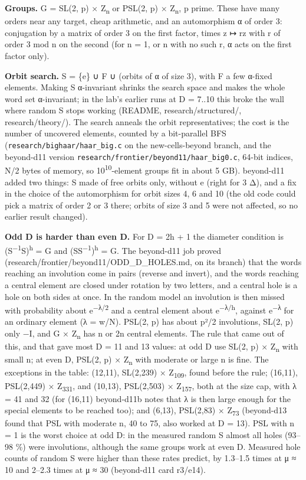 \documentclass[
  10pt,
]{article}
\begin{document}
\textbf{Groups.} G = SL(2, p) × Z\textsubscript{n} or PSL(2, p) × Z\textsubscript{n}, p prime. These have many orders
near any target, cheap arithmetic, and an automorphism α of order 3: conjugation by a matrix of order 3 on the first
factor, times z ↦ rz with r of order 3 mod n on the second (for n = 1, or n with no such r, α acts on the first factor
only).

\textbf{Orbit search.} S = \{e\} ∪ F ∪ (orbits of α of size 3), with F a few α-fixed elements. Making S α-invariant
shrinks the search space and makes the whole word set α-invariant; in the lab's earlier runs at D = 7..10 this broke
the wall where random S stops working (README, research/structured/, research/theory/). The search anneals the orbit
representatives; the cost is the number of uncovered elements, counted by a bit-parallel BFS
(\texttt{research/\allowbreak{}bighaar/\allowbreak{}haar\_\allowbreak{}big.c} on the new-cells-beyond branch, and the beyond-d11 version
\texttt{research/\allowbreak{}frontier/\allowbreak{}beyond11/\allowbreak{}haar\_\allowbreak{}big0.c}, 64-bit indices, N/2 bytes of memory, so
10\textsuperscript{10}-element groups fit in about 5 GB). beyond-d11 added two things: S made of free orbits only,
without e (right for 3 \textbar{} Δ), and a fix in the choice of the automorphism for orbit sizes 4, 6 and 10 (the old
code could pick a matrix of order 2 or 3 there; orbits of size 3 and 5 were not affected, so no earlier result
changed).

\textbf{Odd D is harder than even D.} For D = 2h + 1 the diameter condition is
(S\textsuperscript{−1}S)\textsuperscript{h} = G and (SS\textsuperscript{−1})\textsuperscript{h} = G. The beyond-d11
job proved (research/frontier/beyond11/ODD\_D\_HOLES.md, on its branch) that the words reaching an involution come in
pairs (reverse and invert), and the words reaching a central element are closed under rotation by two letters, and a
central hole is a hole on both sides at once. In the random model an involution is then missed with probability about
e\textsuperscript{−λ/2} and a central element about e\textsuperscript{−λ/h}, against e\textsuperscript{−λ} for an
ordinary element (λ = w/N). PSL(2, p) has about p²/2 involutions, SL(2, p) only −I, and G × Z\textsubscript{n} has n
or 2n central elements. The rule that came out of this, and that gave most D = 11 and 13 values: at odd D use SL(2, p)
× Z\textsubscript{n} with small n; at even D, PSL(2, p) × Z\textsubscript{n} with moderate or large n is fine. The
exceptions in the table: (12,11), SL(2,239) × Z\textsubscript{109}, found before the rule; (16,11), PSL(2,449) ×
Z\textsubscript{331}, and (10,13), PSL(2,503) × Z\textsubscript{157}, both at the size cap, with λ = 41 and 32 (for
(16,11) beyond-d11b notes that λ is then large enough for the special elements to be reached too); and (6,13),
PSL(2,83) × Z\textsubscript{73} (beyond-d13 found that PSL with moderate n, 40 to 75, also worked at D = 13). PSL with
n = 1 is the worst choice at odd D: in the measured random S almost all holes (93--98 \%) were involutions, although
the same groups work at even D. Measured hole counts of random S were higher than these rates predict, by 1.3--1.5
times at μ ≈ 10 and 2--2.3 times at μ ≈ 30 (beyond-d11 card r3/e14).
\end{document}
